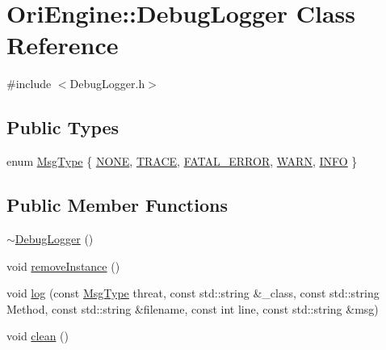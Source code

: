\hypertarget{class_ori_engine_1_1_debug_logger}{}\section{Ori\+Engine\+:\+:Debug\+Logger Class Reference}
\label{class_ori_engine_1_1_debug_logger}


{\ttfamily \#include $<$Debug\+Logger.\+h$>$}

\subsection*{Public Types}
\begin{DoxyCompactItemize}
\item 
enum \hyperlink{class_ori_engine_1_1_debug_logger_a3ac0c97517b3aecb4ea7bdb5b98e6fe5}{Msg\+Type} \{ \newline
\hyperlink{class_ori_engine_1_1_debug_logger_a3ac0c97517b3aecb4ea7bdb5b98e6fe5ab6bcc0b412c72a2126fc3b658b9be961}{N\+O\+NE}, 
\hyperlink{class_ori_engine_1_1_debug_logger_a3ac0c97517b3aecb4ea7bdb5b98e6fe5ace4fa1b1c453dff06bf74511997b28e7}{T\+R\+A\+CE}, 
\hyperlink{class_ori_engine_1_1_debug_logger_a3ac0c97517b3aecb4ea7bdb5b98e6fe5af275ff14d31e843b4d5164d3083a19af}{F\+A\+T\+A\+L\+\_\+\+E\+R\+R\+OR}, 
\hyperlink{class_ori_engine_1_1_debug_logger_a3ac0c97517b3aecb4ea7bdb5b98e6fe5ab4c3d06dbcd91e5cb0578c9fefcfd763}{W\+A\+RN}, 
\newline
\hyperlink{class_ori_engine_1_1_debug_logger_a3ac0c97517b3aecb4ea7bdb5b98e6fe5aaa1f0e20c9d6cb0949c529b79f011b16}{I\+N\+FO}
 \}
\end{DoxyCompactItemize}
\subsection*{Public Member Functions}
\begin{DoxyCompactItemize}
\item 
\hyperlink{class_ori_engine_1_1_debug_logger_a48c9ac551189e990e03290579aa8a986}{$\sim$\+Debug\+Logger} ()
\item 
void \hyperlink{class_ori_engine_1_1_debug_logger_a3fd1279ac33bfd6994e74a402d304d1f}{remove\+Instance} ()
\item 
void \hyperlink{class_ori_engine_1_1_debug_logger_a879e4e9ae75084e9994fd987b8f05705}{log} (const \hyperlink{class_ori_engine_1_1_debug_logger_a3ac0c97517b3aecb4ea7bdb5b98e6fe5}{Msg\+Type} threat, const std\+::string \&\+\_\+class, const std\+::string Method, const std\+::string \&filename, const int line, const std\+::string \&msg)
\item 
void \hyperlink{class_ori_engine_1_1_debug_logger_aaed348f81d341ecae87c9f61a40eb3bf}{clean} ()
\end{DoxyCompactItemize}
